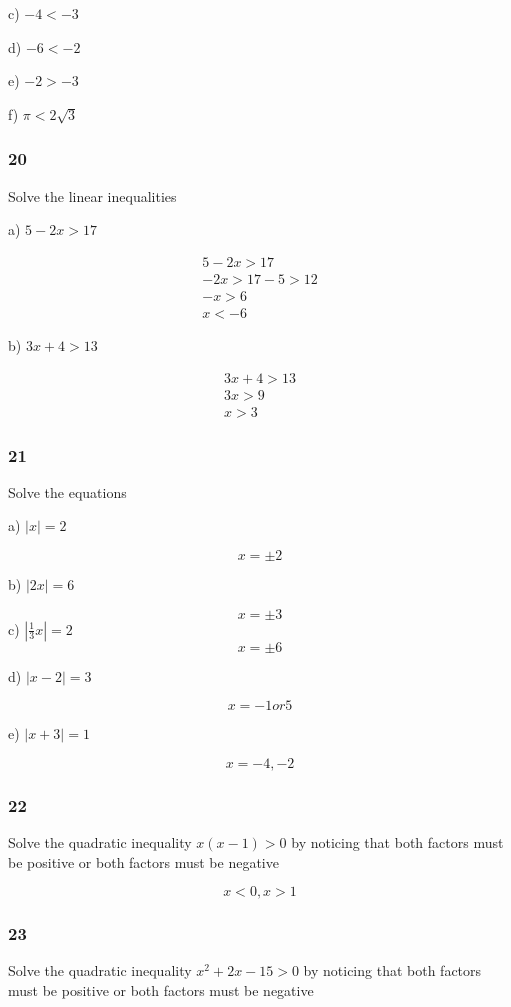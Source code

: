 \documentclass[]{report}
\begin{document}
c) $-4 < -3 $

d) $-6 < -2$

e) $-2 > -3$

f) $\pi < 2\sqrt{3}$

\subsubsection{20}

Solve the linear inequalities

a) $ 5-2x > 17 $

\begin{align*}
5-2x > 17  \\
-2x > 17 - 5 > 12 \tag*{taking 5 off}\\
-x > 6 \tag*{dividing by 2}\\
x < -6 \tag*{multiplying by -1}
\end{align*}

b) $ 3x + 4 > 13$

\begin{align*}
3x + 4 > 13 \\
3x > 9 \tag*{taking 4 off}\\
x > 3 \tag*{dividing by 3}
\end{align*}

\subsubsection{21}

Solve the equations

a) $|x| = 2 $

\[
x = \pm 2
\]

b) $|2x| = 6$

\[
x = \pm 3
\]
c) $|\frac{1}{3}x| = 2 $
\[
x = \pm 6
\]

d) $|x-2| = 3 $

\[
x = -1 or 5
\]

e) $|x + 3 | = 1$

\[
x = -4, -2
\]

\subsubsection{22}

Solve the quadratic inequality $x(x-1) > 0$ by noticing that both factors must be positive or both factors must be negative

\[
x < 0 , x > 1
\]

\subsubsection{23}
Solve the quadratic inequality $x^2 + 2x - 15 > 0$ by noticing that both factors must be positive or both factors must be negative
\end{document}
